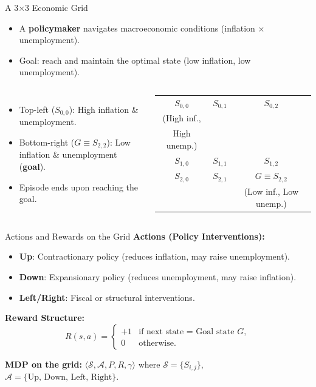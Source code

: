 \documentclass[10pt,english,aspectratio=169]{beamer}
\begin{document}
\begin{frame}{A 3$\times$3 Economic Grid}
\begin{itemize}
    \item A \textbf{policymaker} navigates macroeconomic conditions (inflation $\times$ unemployment).
    \item Goal: reach and maintain the optimal state (low inflation, low unemployment).
\end{itemize}

\begin{columns}
\begin{itemize}
    \item Top-left ($S_{0,0}$): High inflation \& unemployment.
    \item Bottom-right ($G \equiv S_{2,2}$): Low inflation \& unemployment (\textbf{goal}).
    \item Episode ends upon reaching the goal.
\end{itemize}

\centering
\footnotesize
\begin{tabular}{|c|c|c|}
\hline
$S_{0,0}$ & $S_{0,1}$ & $S_{0,2}$ \\[2pt]
\scriptsize (High inf., & & \\[-2pt]
\scriptsize High unemp.) & & \\
\hline
$S_{1,0}$ & $S_{1,1}$ & $S_{1,2}$ \\
\hline
$S_{2,0}$ & $S_{2,1}$ & $G\equiv S_{2,2}$ \\[2pt]
& & \scriptsize (Low inf., Low unemp.)\\
\hline
\end{tabular}
\end{columns}
\end{frame}

\begin{frame}{Actions and Rewards on the Grid}
\textbf{Actions (Policy Interventions):}
\begin{itemize}
    \item \textbf{Up}: Contractionary policy (reduces inflation, may raise unemployment).
    \item \textbf{Down}: Expansionary policy (reduces unemployment, may raise inflation).
    \item \textbf{Left/Right}: Fiscal or structural interventions.
\end{itemize}

\vspace{0.3cm}
\textbf{Reward Structure:}
\[
R(s,a)=
\begin{cases}
+1 & \text{if next state = Goal state } G,\\[3pt]
0 & \text{otherwise.}
\end{cases}
\]

\vspace{0.3cm}
\textbf{MDP on the grid:}
$\langle \mathcal{S}, \mathcal{A}, P, R, \gamma \rangle$ where $\mathcal{S} = \{S_{i,j}\}$, $\mathcal{A} = \{\text{Up, Down, Left, Right}\}$.
\end{frame}
\end{document}
